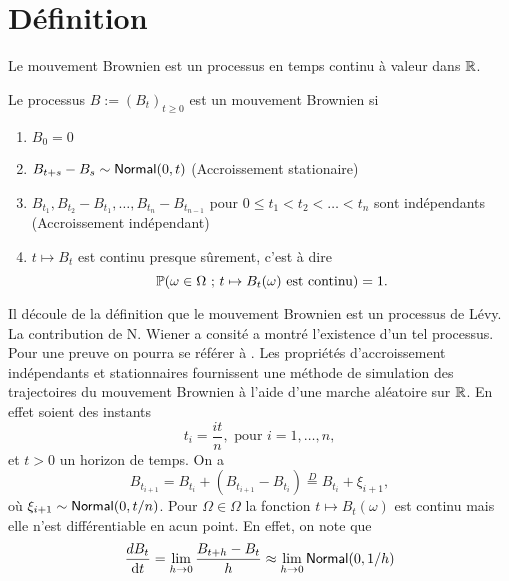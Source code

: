 \section{Définition}
Le mouvement Brownien est un processus en temps continu à valeur dans $\mathbb{R}$.
\begin{definition}\label{def:mb}
Le processus $B:=(B_t)_{t\geq 0}$ est un mouvement Brownien si 
\begin{enumerate}
  \item $B_0 = 0$
  \item $B_{t+s}-B_s\sim\mathsf{Normal}(0,t)$ (Accroissement stationaire)
  \item $B_{t_1}, B_{t_2} - B_{t_1},\ldots, B_{t_n} - B_{t_{n-1}}$ pour $0\leq t_1<t_2<\ldots<t_n$ sont indépendants (Accroissement indépendant)
  \item $t\mapsto B_t$ est continu presque sûrement, c'est à dire 
  $$
  \mathbb{P}(\omega\in\Omega\text{ ; }t\mapsto B_t(\omega)\text{ est continu}) = 1.
  $$
\end{enumerate}
\end{definition}
Il découle de la définition que le mouvement Brownien est un processus de Lévy. La contribution de N. Wiener a consité a montré l'existence d'un tel processus. Pour une preuve on pourra se référer à \citet[Chapitre 2]{Gall2012}. Les propriétés d'accroissement indépendants et stationnaires fournissent une méthode de simulation des trajectoires du mouvement Brownien à l'aide d'une marche aléatoire sur $\mathbb{R}$. En effet soient des instants 
$$
t_i = \frac{it}{n},\text{ pour }i =1,\ldots, n,
$$
et $t>0$ un horizon de temps. On a 
$$
B_{t_{i+1}} = B_{t_{i}} + (B_{t_{i+1}}-B_{t_{i}}) \overset{D}{=} B_{t_{i}} + \xi_{i+1},
$$
où $\xi_{i+1} \sim \mathsf{Normal}(0, t/n)$. Pour $\Omega\in \Omega$ la fonction $t\mapsto B_{t}(\omega)$ est continu mais elle n'est différentiable en acun point. En effet, on note que 
$$
\frac{d B_t}{\text{d}t} = \lim_{h\rightarrow0}\frac{B_{t+h}- B_{t}}{h}\approx\lim_{h\rightarrow0}\mathsf{Normal}(0,1/h)
$$
